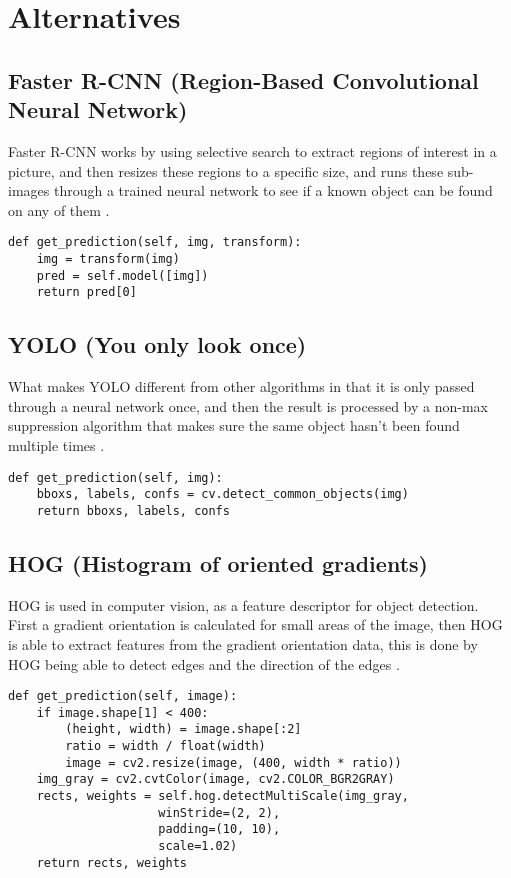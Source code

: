 \section{Alternatives}
\subsection{Faster R-CNN (Region-Based Convolutional Neural Network)}
Faster R-CNN works by using selective search to extract regions of interest in a picture, and then resizes these regions to a specific size, and runs these sub-images through a trained neural network to see if a known object can be found on any of them \cite[sec.~2]{rcnn}.

\begin{verbatim}
def get_prediction(self, img, transform):
	img = transform(img)
	pred = self.model([img])
	return pred[0]
\end{verbatim}

\subsection{YOLO (You only look once)}
What makes YOLO different from other algorithms in that it is only passed through a neural network once, and then the result is processed by a non-max suppression algorithm that makes sure the same object hasn't been found multiple times \cite{yolo}.

\begin{verbatim}
def get_prediction(self, img):
	bboxs, labels, confs = cv.detect_common_objects(img)
    return bboxs, labels, confs
\end{verbatim}

\subsection{HOG (Histogram of oriented gradients)}
HOG is used in computer vision, as a feature descriptor for object detection. First a gradient orientation is calculated for small areas of the image, then HOG is able to extract features from the gradient orientation data, this is done by HOG being able to detect  edges and the direction of the edges \cite{hog}.

\begin{verbatim}
def get_prediction(self, image):
	if image.shape[1] < 400:
		(height, width) = image.shape[:2]
		ratio = width / float(width)
		image = cv2.resize(image, (400, width * ratio))
	img_gray = cv2.cvtColor(image, cv2.COLOR_BGR2GRAY)
	rects, weights = self.hog.detectMultiScale(img_gray,
					 winStride=(2, 2),
					 padding=(10, 10),
					 scale=1.02)
	return rects, weights
\end{verbatim}
